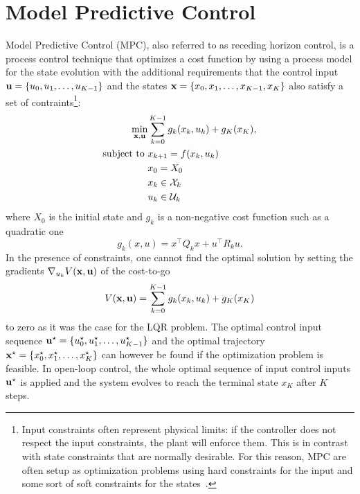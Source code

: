 \chapter{Model Predictive Control}
\label{sec:MPC}

Model Predictive Control (MPC), also referred to as receding horizon control, is a process control technique that optimizes a cost function by using a process model for the state evolution with the additional requirements that the control input $\boldsymbol{\mathrm{u}} = \{u_0,u_1,\ldots,u_{K-1}\}$ and the states $\boldsymbol{\mathrm{x}} = \{x_0,x_1,\ldots,x_{K-1},x_K\}$ also satisfy a set of contraints\footnote{Input constraints often represent physical limits: if the controller does not respect the input constraints, the plant will enforce them. This is in contrast with state constraints that are normally desirable. For this reason, MPC are often setup as optimization problems using hard constraints for the input and some sort of soft constraints for the states~\cite{MPC-diehl}.}:
\begin{equation}
  \label{eq:MPC-general-formulation}
  \begin{aligned}
    \min_{\boldsymbol{\mathrm{x}},\boldsymbol{\mathrm{u}}} &\sum_{k=0}^{K-1} g_k(x_k,u_k) + g_K(x_K),\\
    \text{subject to } & x_{k+1} = f(x_k,u_k) \\
                     & x_0 = X_0 \\
                     & x_k \in \mathcal{X}_k \\
                     & u_k \in \mathcal{U}_k
  \end{aligned}
\end{equation}
where $X_0$ is the initial state and $g_k$ is a non-negative cost function such as a quadratic one
\begin{equation}
  \label{eq:quadratic-stage-cost}
  g_k(x,u) = x^\top Q_k x + u^\top R_k u.
\end{equation}
In the presence of constraints, one cannot find the optimal solution by setting the gradients $\nabla_{u_k} V(\boldsymbol{\mathrm{x}},\boldsymbol{\mathrm{u}})$ of the cost-to-go
\begin{equation}
  \label{eq:cost-to-go}
  V(\boldsymbol{\mathrm{x}},\boldsymbol{\mathrm{u}}) = \sum_{k=0}^{K-1} g_k(x_k,u_k) + g_K(x_K)
\end{equation}
to zero as it was the case for the LQR problem. The optimal control input sequence $\boldsymbol{\mathrm{u}}^\star = \{u_0^\star,u_1^\star,\ldots,u_{K-1}^\star\}$ and the optimal trajectory $\boldsymbol{\mathrm{x}}^\star = \{x_0^\star,x_1^\star,\ldots,x_K^\star\}$ can however be found if the optimization problem is feasible. In open-loop control, the whole optimal sequence of input control inputs $\boldsymbol{\mathrm{u}}^\star$ is applied and the system evolves to reach the terminal state $x_K$ after $K$ steps.

